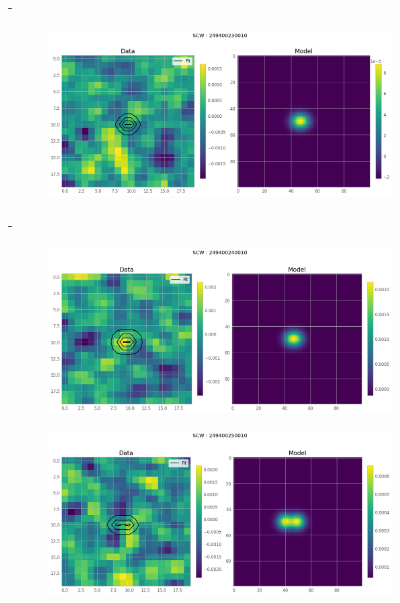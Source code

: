 \documentclass[
	a4paper, %
	10pt, %
	unnumberedsections, %
	twoside, %
]{LTJournalArticle}
\begin{document}
\begin{figure}[H]
\begin{subfigure}{.47\textwidth}
    \end{subfigure}
    \hspace{1em}-
    \begin{subfigure}{.47\textwidth}
        \includegraphics[width=\textwidth]{report/Figures/models/2204/23_psf_const.png}
    \end{subfigure}%
    \hspace{1em}-
    \begin{subfigure}{.47\textwidth}
        \centering
        \includegraphics[width=\textwidth]{report/Figures/models/2204/24_psf_const.png}
    \end{subfigure}
    \begin{subfigure}{.47\textwidth}
        \centering
        \includegraphics[width=\textwidth]{report/Figures/models/2204/25_psf_const.png}

\end{subfigure}
\end{figure}
\end{document}
